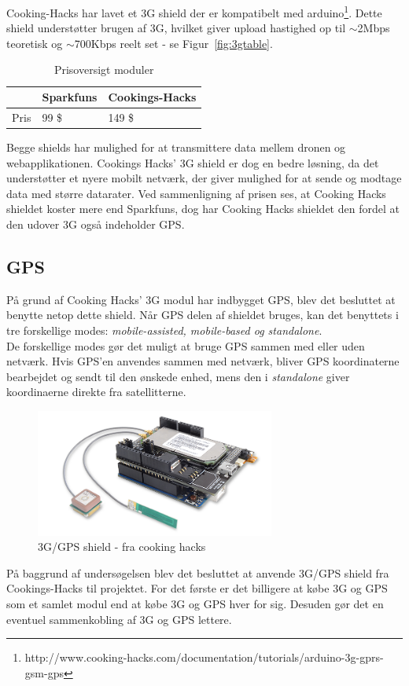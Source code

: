 Cooking-Hacks har lavet et 3G shield der er kompatibelt med arduino\footnote{http://www.cooking-hacks.com/documentation/tutorials/arduino-3g-gprs-gsm-gps}. Dette shield understøtter brugen af 3G, hvilket giver upload hastighed op til $\sim$2Mbps teoretisk og $\sim$700Kbps reelt set - se Figur~\ref{fig:3gtable}.

\begin{table}[H]
	\centering
		\begin{tabular}{|p{3.5cm}|p{5 cm}|p{5 cm}|} 
		\hline
			\textbf{ } & \textbf{Sparkfuns} 	& \textbf{Cookings-Hacks} \\ \hline
					Pris& 99 \$  & 149 \$ \\ \hline			 					 			
		\end{tabular}
	\caption{Prisoversigt moduler}
\end{table}

\newpage

Begge shields har mulighed for at transmittere data mellem dronen og webapplikationen. Cookings Hacks' 3G shield er dog en bedre løsning, da det understøtter et nyere mobilt netværk, der giver mulighed for at sende og modtage data med større datarater.
Ved sammenligning af prisen ses, at Cooking Hacks shieldet koster mere end Sparkfuns, dog har Cooking Hacks shieldet den fordel at den udover 3G også indeholder GPS.

\subsection{GPS}
På grund af Cooking Hacks' 3G modul har indbygget GPS, blev det besluttet at benytte netop dette shield. Når GPS delen af shieldet bruges, kan det benyttets i tre forskellige modes: \textit{mobile-assisted, mobile-based og standalone}. \\
De forskellige modes gør det muligt at bruge GPS sammen med eller uden netværk. Hvis GPS'en anvendes sammen med netværk, bliver GPS koordinaterne bearbejdet og sendt til den ønskede enhed, mens den i \textit{standalone} giver koordinaerne direkte fra satellitterne.

\begin{figure}[H]
\centering
\includegraphics[width=0.7\textwidth]{Billeder/3G.png}
\caption{3G/GPS shield - fra cooking hacks\protect\footnotemark}
\label{fig:3gshield}
\end{figure}


På baggrund af undersøgelsen blev det besluttet at anvende 3G/GPS shield fra Cookings-Hacks til projektet. For det første er det billigere at købe 3G og GPS som et samlet modul end at købe 3G og GPS hver for sig. Desuden gør det en eventuel sammenkobling af 3G og GPS lettere.











